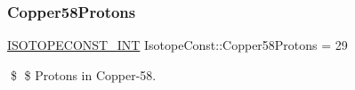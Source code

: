 \subsubsection{\texorpdfstring{Copper58\+Protons}{Copper58Protons}}
{\footnotesize\ttfamily \mbox{\hyperlink{group___isotope_const-_macros_ga5f18360b3e99483a35c32d789e62621c}{I\+S\+O\+T\+O\+P\+E\+C\+O\+N\+S\+T\+\_\+\+I\+NT}} Isotope\+Const\+::\+Copper58\+Protons = 29}

\$ \$ Protons in Copper-\/58. 